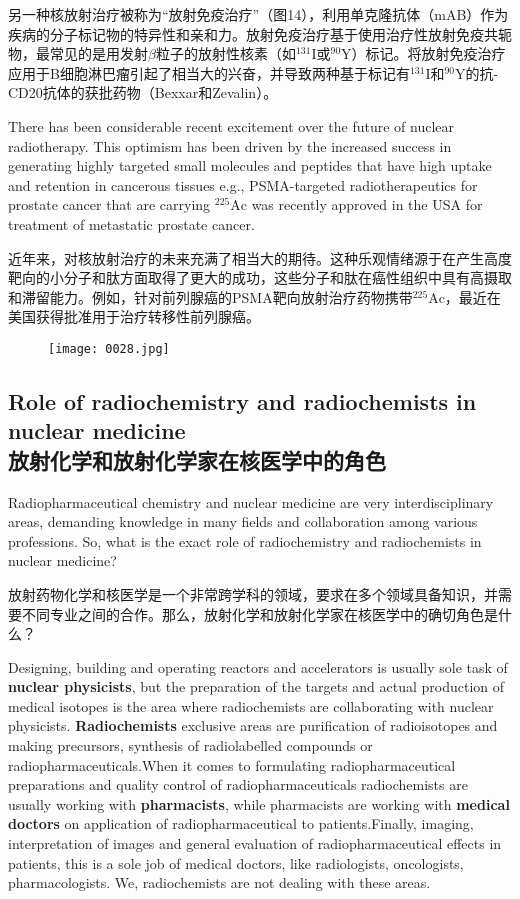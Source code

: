 \documentclass[dvipsnames, svgnames,a4paper,11pt]{article}
\begin{document}
另一种核放射治疗被称为“放射免疫治疗”（图14），利用单克隆抗体（mAB）作为疾病的分子标记物的特异性和亲和力。放射免疫治疗基于使用治疗性放射免疫共轭物，最常见的是用发射$\beta$粒子的放射性核素（如${}^\text{131}\text{I}$或${}^\text{90}\text{Y}$）标记。将放射免疫治疗应用于B细胞淋巴瘤引起了相当大的兴奋，并导致两种基于标记有${}^\text{131}\text{I}$和${}^\text{90}\text{Y}$的抗-CD20抗体的获批药物（Bexxar和Zevalin）。

There has been considerable recent excitement over the future of nuclear radiotherapy. This optimism has been driven by the increased success in generating highly targeted small molecules and peptides that have high uptake and retention in cancerous tissues e.g., PSMA-targeted radiotherapeutics for prostate cancer that are carrying \(\mathrm{^{225}Ac}\) was recently approved in the USA for treatment of metastatic prostate cancer.

近年来，对核放射治疗的未来充满了相当大的期待。这种乐观情绪源于在产生高度靶向的小分子和肽方面取得了更大的成功，这些分子和肽在癌性组织中具有高摄取和滞留能力。例如，针对前列腺癌的PSMA靶向放射治疗药物携带\(\mathrm{^{225}Ac}\)，最近在美国获得批准用于治疗转移性前列腺癌。

\begin{figure}[htbp]
      \centering
      \texttt{[image: 0028.jpg]}
       \label{fig14}
\end{figure}

\subsection{Role of radiochemistry and radiochemists in nuclear medicine\\放射化学和放射化学家在核医学中的角色}

Radiopharmaceutical chemistry and nuclear medicine are very interdisciplinary areas, demanding knowledge in many fields and collaboration among various professions. So, what is the exact role of radiochemistry and radiochemists in nuclear medicine?

放射药物化学和核医学是一个非常跨学科的领域，要求在多个领域具备知识，并需要不同专业之间的合作。那么，放射化学和放射化学家在核医学中的确切角色是什么？

Designing, building and operating reactors and accelerators is usually sole task of \textbf{nuclear physicists}, but the preparation of the targets and actual production of medical isotopes is the area where radiochemists are collaborating with nuclear physicists. \textbf{Radiochemists} exclusive areas are purification of radioisotopes and making precursors, synthesis of radiolabelled compounds or radiopharmaceuticals.When it comes to formulating radiopharmaceutical preparations and quality control of radiopharmaceuticals radiochemists are usually working with \textbf{pharmacists}, while pharmacists are working with \textbf{medical doctors} on application of radiopharmaceutical to patients.Finally, imaging, interpretation of images and general evaluation of radiopharmaceutical effects in patients, this is a sole job of medical doctors, like radiologists, oncologists, pharmacologists. We, radiochemists are not dealing with these areas.
\end{document}
